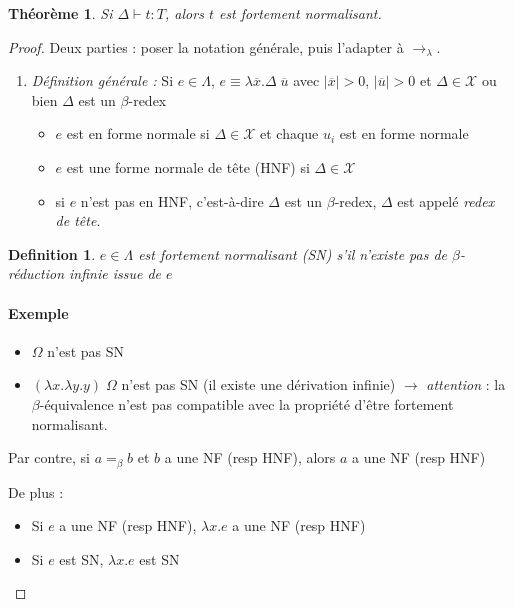 \documentclass{article}
\newtheorem{thm}{Théorème}
\newtheorem{defi}{Definition}
\newcommand\lterm[2]{\lambda #1. #2}
\begin{document}
\begin{thm}
Si $\Delta \vdash t : T$, alors $t$ est fortement normalisant.
\end{thm}

\begin{proof}
Deux parties : poser la notation générale, puis l'adapter à $\to_\lambda$.

\begin{enumerate}
\item \emph{Définition générale :} Si $e \in \Lambda$, $e\equiv \lterm{\overline{x}}{\Delta \; \overline{u}}$ avec $|\overline{x}|>0$, $|\overline{u}|>0$ et $\Delta \in \mathcal{X}$ ou bien $\Delta$ est un $\beta$-redex
\begin{itemize}
\item $e$ est en forme normale si $\Delta \in \mathcal{X}$ et chaque $u_i$ est en forme normale
\item $e$ est une forme normale de tête (HNF) si $\Delta \in \mathcal{X}$
\item si $e$ n'est pas en HNF, c'est-à-dire $\Delta$ est un $\beta$-redex, $\Delta$ est appelé \emph{redex de tête}.
\end{itemize}
\end{enumerate}

\begin{defi}
$e \in \Lambda$ est fortement normalisant (SN) s'il n'existe pas de $\beta$-réduction infinie issue de $e$
\end{defi}

\paragraph{Exemple}
\begin{itemize}
\item $\Omega$ n'est pas SN
\item $(\lterm{x}{\lterm{y}{y}}) \; \Omega$ n'est pas SN (il existe une dérivation infinie) $\to$ \emph{attention} : la $\beta$-équivalence n'est pas compatible avec la propriété d'être fortement normalisant.
\end{itemize}

Par contre, si $a=_\beta b$ et $b$ a une NF (resp HNF), alors $a$ a une NF (resp HNF)

De plus :
\begin{itemize}
\item Si $e$ a une NF (resp HNF), $\lterm{x}{e}$ a une NF (resp HNF)
\item Si $e$ est SN, $\lterm{x}{e}$ est SN
\end{itemize}
\bigskip


\end{proof}
\end{document}
